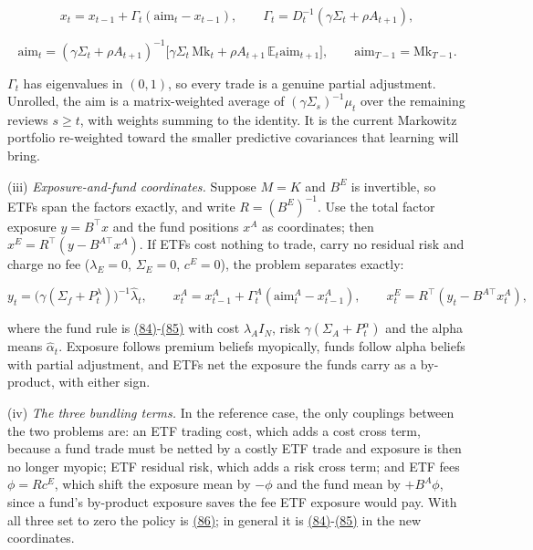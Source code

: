 \documentclass[11pt]{article}
\begin{document}
\begin{equation*}
x_t=x_{t-1}+\Gamma_t(\mathrm{aim}_t-x_{t-1}),\qquad
\Gamma_t=D_t^{-1}(\gamma\Sigma_t+\rho A_{t+1}),\tag{84}\label{eq:84}
\end{equation*}

\begin{equation*}
\mathrm{aim}_t=(\gamma\Sigma_t+\rho A_{t+1})^{-1}
 \bigl[\gamma\Sigma_t\,\mathrm{Mk}_t+\rho A_{t+1}\,\mathbb E_t\mathrm{aim}_{t+1}\bigr],
\qquad \mathrm{aim}_{T-1}=\mathrm{Mk}_{T-1}.\tag{85}\label{eq:85}
\end{equation*}

\(\Gamma_t\) has eigenvalues in \((0,1)\), so every trade is a genuine
partial adjustment. Unrolled, the aim is a matrix-weighted average of
\((\gamma\Sigma_s)^{-1}\mu_t\) over the remaining reviews \(s\geq t\), with
weights summing to the identity. It is the current Markowitz
portfolio re-weighted toward the smaller predictive covariances that
learning will bring.

(iii) \emph{Exposure-and-fund coordinates.} Suppose \(M=K\) and \(B^E\) is
invertible, so ETFs span the factors exactly, and write
\(R=(B^E)^{-1}\). Use the total factor exposure \(y=B^\top x\) and the fund
positions \(x^A\) as coordinates; then \(x^E=R^\top(y-B^{A\top}x^A)\). If
ETFs cost nothing to trade, carry no residual risk and charge no fee
(\(\lambda_E=0\), \(\Sigma_E=0\), \(c^E=0\)), the problem separates exactly:

\begin{equation*}
y_t=\bigl(\gamma(\Sigma_f+P^\lambda_t)\bigr)^{-1}\hat\lambda_t,\qquad
x^A_t=x^A_{t-1}+\Gamma^A_t(\mathrm{aim}^A_t-x^A_{t-1}),\qquad
x^E_t=R^\top(y_t-B^{A\top}x^A_t),\tag{86}\label{eq:86}
\end{equation*}

where the fund rule is \hyperref[eq:84]{(84)}-\hyperref[eq:85]{(85)} with cost \(\lambda_AI_N\), risk
\(\gamma(\Sigma_A+P^\alpha_t)\) and the alpha means \(\hat\alpha_t\). Exposure
follows premium beliefs myopically, funds follow alpha beliefs with
partial adjustment, and ETFs net the exposure the funds carry as a
by-product, with either sign.

(iv) \emph{The three bundling terms.} In the reference case, the only
couplings between the two problems are: an ETF trading cost, which
adds a cost cross term, because a fund trade must be netted by a
costly ETF trade and exposure is then no longer myopic; ETF residual
risk, which adds a risk cross term; and ETF fees \(\phi=Rc^E\), which
shift the exposure mean by \(-\phi\) and the fund mean by \(+B^A\phi\), since
a fund's by-product exposure saves the fee ETF exposure would pay. With
all three set to zero the policy is \hyperref[eq:86]{(86)}; in general it is \hyperref[eq:84]{(84)}-\hyperref[eq:85]{(85)}
in the new coordinates.
\end{document}
